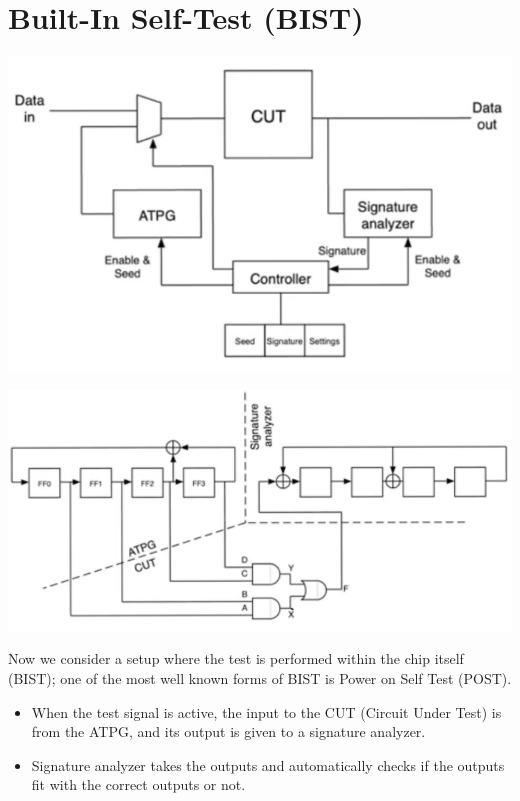 \documentclass[11pt]{article}
\begin{document}
\section*{Built-In Self-Test (BIST)}
\begin{center}
    \begin{minipage}{0.45\linewidth}
        \centering
        \includegraphics[width=1\linewidth]{6.png}
    \end{minipage}
    \hfill
    \begin{minipage}{0.45\linewidth}
        \centering
        \includegraphics[width=1\linewidth]{7.png}
    \end{minipage}   
\end{center}
Now we consider a setup where the test is performed within the chip itself (BIST); one of the most well known forms of BIST is Power on Self Test (POST).
\begin{itemize}
    \item When the test signal is active, the input to the CUT (Circuit Under Test) is from the ATPG, and its output is given to a signature analyzer.
    \item Signature analyzer takes the outputs and automatically checks if the outputs fit with the correct outputs or not.
\end{itemize}
\end{document}
